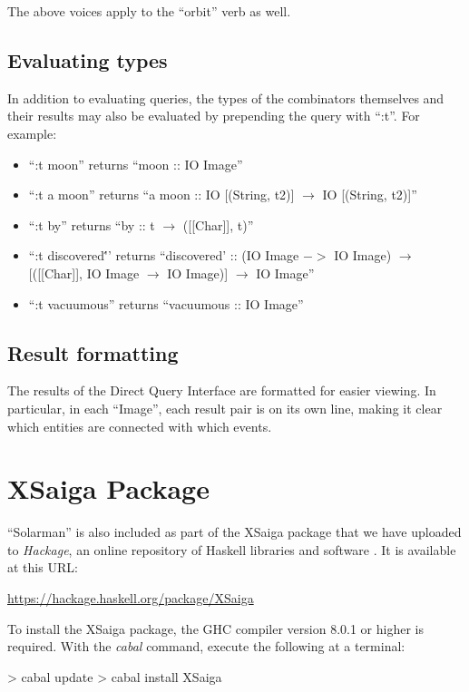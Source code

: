 \documentclass[../main.tex]{subfiles}
\begin{document}
The above voices apply to the ``orbit'' verb as well.

\subsection{Evaluating types}

In addition to evaluating queries, the types of the combinators themselves and their results may also be evaluated by prepending the query with
``:t''.  For example:

\begin{itemize}
	\item ``:t moon'' returns ``moon :: IO Image''
	\item ``:t a moon'' returns ``a moon :: IO [(String,  t2)] $\rightarrow$ IO [(String,  t2)]''
	\item ``:t by'' returns ``by :: t $\rightarrow$ ([[Char]],  t)''
	\item ``:t discovered\''' returns ``discovered'	:: (IO Image $->$ IO Image) $\rightarrow$ [([[Char]],  IO Image $\rightarrow$ IO Image)] $\rightarrow$ IO Image''
	\item ``:t vacuumous'' returns ``vacuumous :: IO Image''
\end{itemize}

\subsection{Result formatting}

The results of the Direct Query Interface are formatted for easier viewing.  In particular, in each ``Image'', each result pair is on its own line, making
it clear which entities are connected with which events.

\section{XSaiga Package}

``Solarman'' is also included as part of the XSaiga package that we have uploaded to {\em Hackage}, an online repository of Haskell libraries and software \cite{XSaiga:2016}.
It is available at this URL:

\url{https://hackage.haskell.org/package/XSaiga}

To install the XSaiga package, the GHC compiler version 8.0.1 or higher is required.  With the {\em cabal} command, execute the following at a terminal:

\begin{code}
	> cabal update
	> cabal install XSaiga
\end{code}
\end{document}
